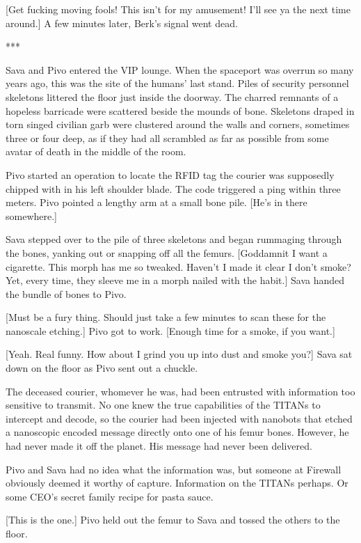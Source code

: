 [Get fucking moving fools! This isn't for my amusement!  I'll see ya
the next time around.] A few minutes later, Berk's signal went dead.

\begin{center}
  ***
\end{center}

Sava and Pivo entered the VIP lounge. When the spaceport was overrun
so many years ago, this was the site of the humans' last stand. Piles
of security personnel skeletons littered the floor just inside the
doorway. The charred remnants of a hopeless barricade were scattered
beside the mounds of bone. Skeletons draped in torn singed civilian
garb were clustered around the walls and corners, sometimes three or
four deep, as if they had all scrambled as far as possible from some
avatar of death in the middle of the room.

Pivo started an operation to locate the RFID tag the courier was
supposedly chipped with in his left shoulder blade. The code triggered
a ping within three meters. Pivo pointed a lengthy arm at a small bone
pile. [He's in there somewhere.]

Sava stepped over to the pile of three skeletons and began rummaging
through the bones, yanking out or snapping off all the
femurs. [Goddamnit I want a cigarette. This morph has me so
tweaked. Haven't I made it clear I don't smoke? Yet, every time, they
sleeve me in a morph nailed with the habit.] Sava handed the bundle of
bones to Pivo.

[Must be a fury thing. Should just take a few minutes to scan these
for the nanoscale etching.] Pivo got to work.  [Enough time for a
smoke, if you want.]

[Yeah. Real funny. How about I grind you up into dust and smoke you?]
Sava sat down on the floor as Pivo sent out a chuckle.

The deceased courier, whomever he was, had been entrusted with
information too sensitive to transmit.  No one knew the true
capabilities of the TITANs to intercept and decode, so the courier had
been injected with nanobots that etched a nanoscopic encoded message
directly onto one of his femur bones. However, he had never made it
off the planet. His message had never been delivered.

Pivo and Sava had no idea what the information was, but someone at
Firewall obviously deemed it worthy of capture. Information on the
TITANs perhaps. Or some CEO's secret family recipe for pasta sauce.

[This is the one.] Pivo held out the femur to Sava and tossed the
others to the floor.

